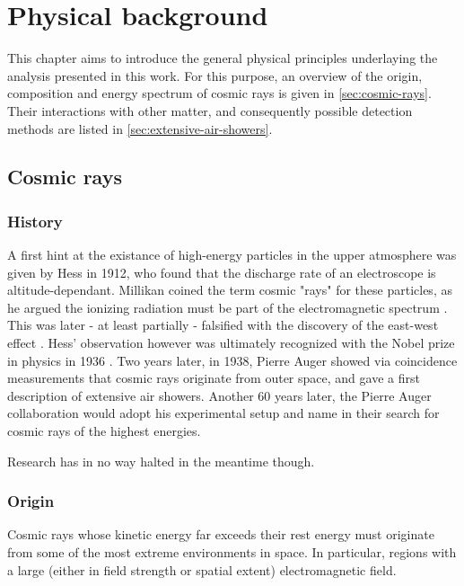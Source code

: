 
\chapter{Physical background}
\label{chap:physical-background}

This chapter aims to introduce the general physical principles underlaying the analysis presented in this work. For this purpose, an overview of 
the origin, composition and energy spectrum of cosmic rays is given in \autoref{sec:cosmic-rays}. Their interactions with other matter, and
consequently possible detection methods are listed in \autoref{sec:extensive-air-showers}.

\section{Cosmic rays}
\label{sec:cosmic-rays}

\subsection{History}
\label{ssec:cr-history}

A first hint at the existance of high-energy particles in the upper atmosphere was given by Hess in 1912, who found that the discharge rate of 
an electroscope is altitude-dependant. Millikan coined the term cosmic "rays" for these particles, as he argued the ionizing radiation must be 
part of the electromagnetic spectrum \cite{millikan1928origin}. This was later - at least partially - falsified with the discovery of the 
east-west effect \cite{johnson1938note}. Hess' observation however was ultimately recognized with the Nobel prize in physics in 1936 
\cite{nobelprize1936}. Two years later, in 1938, Pierre Auger showed via coincidence measurements that cosmic rays originate from outer space, and
gave a first description of extensive air showers. Another 60 years later, the Pierre Auger collaboration would adopt his experimental setup and 
name in their search for cosmic rays of the highest energies.

Research has in no way halted in the meantime though. 

\subsection{Origin}
\label{ssec:cr-origin}

Cosmic rays whose kinetic energy far exceeds their rest energy must originate from some of the most extreme environments in space. In particular,
regions with a large (either in field strength or spatial extent) electromagnetic field.

